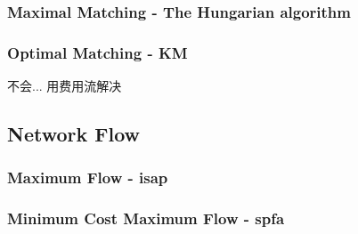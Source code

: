 		\subsubsection{Maximal Matching - The Hungarian algorithm}
			
		\subsubsection{Optimal Matching - KM}
			不会... 用费用流解决
	\subsection{Network Flow}
		\subsubsection{Maximum Flow - isap}
			
		\subsubsection{Minimum Cost Maximum Flow - spfa}
			
		
